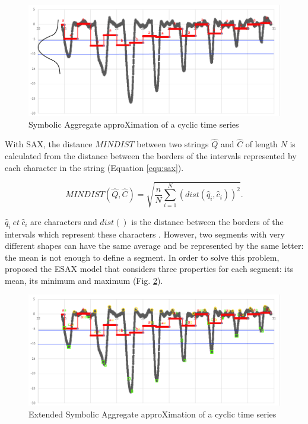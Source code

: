  \begin{figure}[h]
  \centering
   \includegraphics[scale=0.6]{images/sax-p/sax2}
    \caption{Symbolic Aggregate approXimation of a cyclic time series}
  \label{fig:sax}
  \end{figure}
	

With SAX, the distance $MINDIST$ between two strings $\hat{Q}$ and $\hat{C}$ of length $N$ is calculated from the
distance between the borders of the intervals represented by each character in the string 
(Equation \ref{equ:sax}).


\begin{equation}
MINDIST(\hat{Q},\hat{C})=\sqrt{\frac{n}{N}\sum_{i=1}^{N}(dist(\hat{q}_{i},\hat{c}_{i}))^{2}}.
\label{equ:sax}
\end{equation}


$\hat{q}_{i}\:et\:\hat{c}_{i}$ are characters and $ dist() $ is the distance between the borders of 
the intervals which represent these characters  \cite{lin2003symbolic}. However, two segments with very 
different shapes can have the same average and be represented by the same letter: the mean is not 
enough to define a segment. In order to solve this problem, \cite{Lkhagva2006} proposed the ESAX 
model that considers three properties for each segment: its mean, its minimum and maximum (Fig. \ref{fig:esax}).

 \begin{figure}[h]
  \centering
   \includegraphics[scale=0.6]{images/sax-p/Esax}
    \caption{Extended Symbolic Aggregate approXimation of a cyclic time series}
  \label{fig:esax}
  \end{figure}

